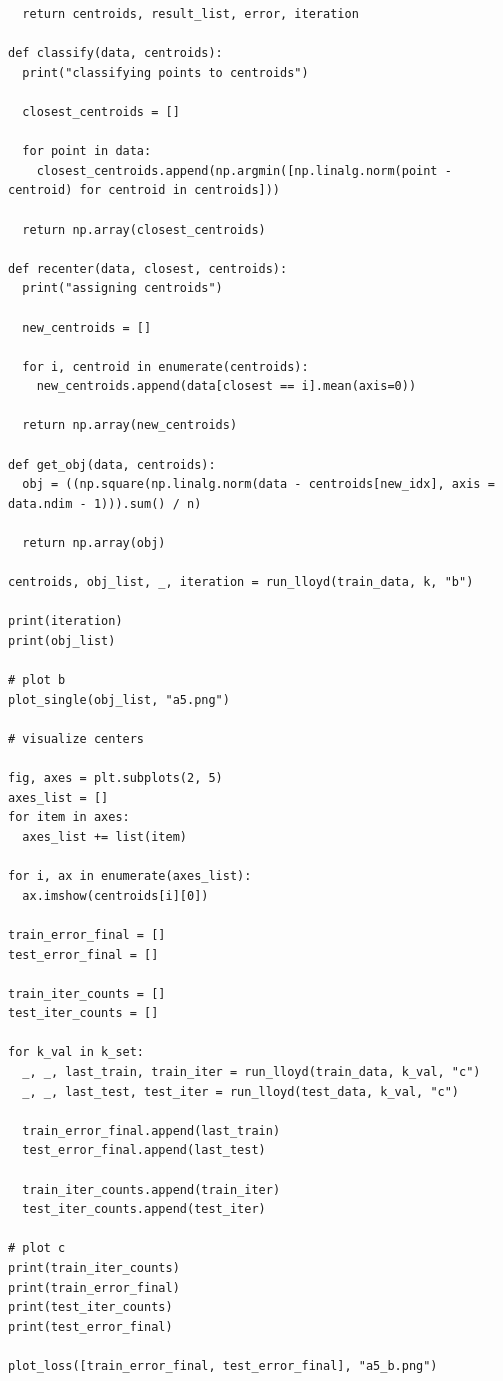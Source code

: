 \documentclass{article}
\newcommand{\1}{\mathbf{1}}
\begin{document}
{\begin{verbatim}
  return centroids, result_list, error, iteration

def classify(data, centroids):
  print("classifying points to centroids")

  closest_centroids = []

  for point in data:
    closest_centroids.append(np.argmin([np.linalg.norm(point - centroid) for centroid in centroids]))

  return np.array(closest_centroids)

def recenter(data, closest, centroids):
  print("assigning centroids")
  
  new_centroids = []

  for i, centroid in enumerate(centroids):
    new_centroids.append(data[closest == i].mean(axis=0))

  return np.array(new_centroids)

def get_obj(data, centroids):
  obj = ((np.square(np.linalg.norm(data - centroids[new_idx], axis = data.ndim - 1))).sum() / n)

  return np.array(obj)

centroids, obj_list, _, iteration = run_lloyd(train_data, k, "b")

print(iteration)
print(obj_list)

# plot b
plot_single(obj_list, "a5.png")

# visualize centers

fig, axes = plt.subplots(2, 5)
axes_list = []
for item in axes:
  axes_list += list(item)

for i, ax in enumerate(axes_list):
  ax.imshow(centroids[i][0])

train_error_final = []
test_error_final = []

train_iter_counts = []
test_iter_counts = []

for k_val in k_set:
  _, _, last_train, train_iter = run_lloyd(train_data, k_val, "c")
  _, _, last_test, test_iter = run_lloyd(test_data, k_val, "c")

  train_error_final.append(last_train)
  test_error_final.append(last_test)

  train_iter_counts.append(train_iter)
  test_iter_counts.append(test_iter)

# plot c
print(train_iter_counts)
print(train_error_final)
print(test_iter_counts)
print(test_error_final)

plot_loss([train_error_final, test_error_final], "a5_b.png")
\end{verbatim}

\newpage

}
\end{document}
